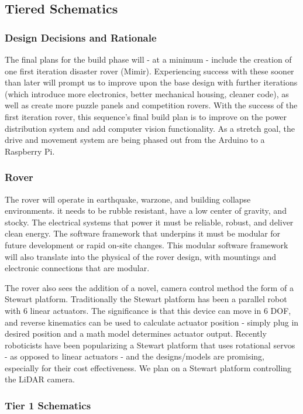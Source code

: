 \documentclass[a4paper, 10pt]{article}
\begin{document}
    \subsection{Tiered Schematics}
	\subsubsection{Design Decisions and Rationale}
	The final plans for the build phase will - at a minimum - include the creation of one first iteration disaster rover (Mimir). Experiencing success with these sooner than later will prompt us to improve upon the base design with further iterations (which introduce more electronics, better mechanical housing, cleaner code), as well as create more puzzle panels and competition rovers.	
	With the success of the first iteration rover, this sequence's final build plan is to improve on the power distribution system and add computer vision functionality. As a stretch goal, the drive and movement system are being phased out from the Arduino to a Raspberry Pi.	
		
		\subsubsection*{Rover}
		The rover will operate in earthquake, warzone, and building collapse environments. it needs to be rubble resistant, have a low center of gravity, and stocky. The electrical systems that power it must be reliable, robust, and deliver clean energy. The software framework that underpins it must be modular for future development or rapid on-site changes. This modular software framework will also translate into the physical of the rover design, with mountings and electronic connections that are modular.
		
		The rover also sees the addition of a novel, camera control method the form of a Stewart platform. Traditionally the Stewart platform has been a parallel robot with 6 linear actuators. The significance is that this device can move in 6 DOF, and reverse kinematics can be used to calculate actuator position - simply plug in desired position and a math model determines actuator output. Recently roboticists have been popularizing a Stewart platform that uses rotational servos - as opposed to linear actuators - and the designs/models are promising, especially for their cost effectiveness. We plan on a Stewart platform controlling the LiDAR camera.

	\subsubsection{Tier 1 Schematics}
\end{document}
